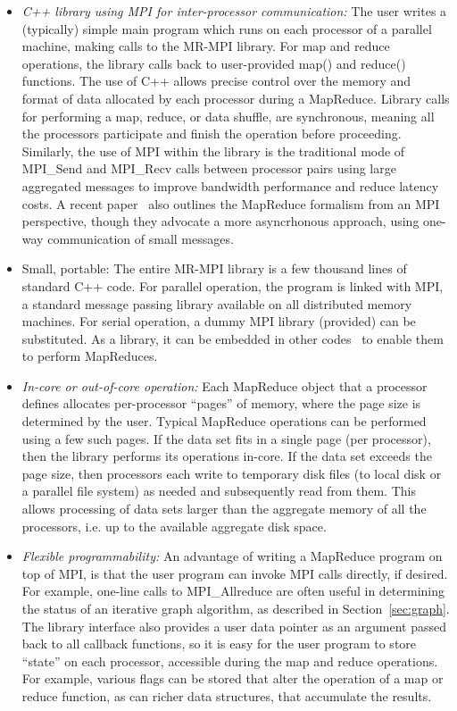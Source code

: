 \begin{itemize}

\item {\it C++ library using MPI for inter-processor communication:}
The user writes a (typically) simple main program which runs on each
processor of a parallel machine, making calls to the MR-MPI library.
For map and reduce operations, the library calls back to user-provided
map() and reduce() functions.  The use of C++ allows precise control
over the memory and format of data allocated by each processor during
a MapReduce.  Library calls for performing a map, reduce, or data
shuffle, are synchronous, meaning all the processors participate and
finish the operation before proceeding.  Similarly, the use of MPI
within the library is the traditional mode of MPI\_Send and
MPI\_Recv calls between processor pairs using large aggregated
messages to improve bandwidth performance and reduce latency costs.  A
recent paper~\cite{Hoefler09} also outlines the MapReduce formalism
from an MPI perspective, though they advocate a more asyncrhonous
approach, using one-way communication of small messages.

\item {Small, portable:} The entire MR-MPI library is a few thousand
lines of standard C++ code.  For parallel operation, the program is
linked with MPI, a standard message passing library available on all
distributed memory machines.  For serial operation, a dummy MPI
library (provided) can be substituted.  As a library, it can be
embedded in other codes~\cite{Titan} to enable them to
perform MapReduces.

\item {\it In-core or out-of-core operation:} Each MapReduce object that a
processor defines allocates per-processor ``pages'' of memory, where
the page size is determined by the user.  Typical MapReduce operations
can be performed using a few such pages.  If the data set fits in a
single page (per processor), then the library performs its operations
in-core.  If the data set exceeds the page size, then processors each
write to temporary disk files (to local disk or a parallel file
system) as needed and subsequently read from them.  This allows
processing of data sets larger than the aggregate memory of all the
processors, i.e. up to the available aggregate disk space.

\item {\it Flexible programmability:} An advantage of writing a
MapReduce program on top of MPI, is that the user program can invoke
MPI calls directly, if desired.  For example, one-line calls to
MPI\_Allreduce are often useful in determining the status of an
iterative graph algorithm, as described in Section~\ref{sec:graph}.
The library interface also provides a user data pointer as an argument
passed back to all callback functions, so it is easy for the user
program to store ``state'' on each processor, accessible during the
map and reduce operations.  For example, various flags can be stored
that alter the operation of a map or reduce function, as can richer
data structures, that accumulate the results.


\end{itemize}
